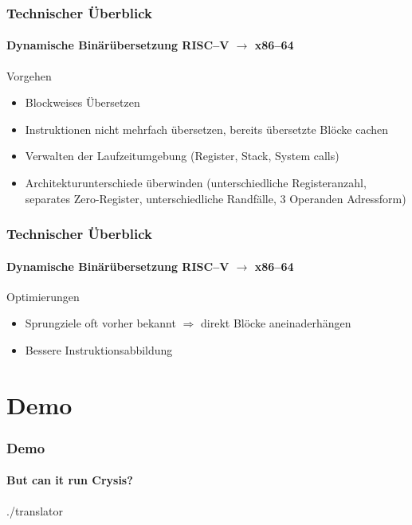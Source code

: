 \documentclass[aspectratio=169, sectionpage=false, german]{tumbeamer}
\newcommand{\conclude}[0]{\ensuremath{\Longrightarrow} }
\newcommand{\refer}[0]{\ensuremath{\rightarrow} }
\begin{document}
\begin{frame}
	\frametitle{Technischer Überblick}

	\framesubtitle {Dynamische Binärübersetzung RISC--V \refer x86--64}

	\begin{block}{Vorgehen}
		\begin{itemize}
			\item Blockweises Übersetzen
			\item Instruktionen nicht mehrfach übersetzen, bereits übersetzte Blöcke cachen %
			\item Verwalten der Laufzeitumgebung (Register, Stack, System calls)
			\item Architekturunterschiede überwinden (unterschiedliche Registeranzahl, separates Zero-Register, unterschiedliche Randfälle, 3 Operanden Adressform)
		\end{itemize}
	\end{block}
\end{frame}

\begin{frame}
	\frametitle{Technischer Überblick}

	\framesubtitle {Dynamische Binärübersetzung RISC--V \refer x86--64}

	\begin{block}{Optimierungen}
		\begin{itemize}
			\item Sprungziele oft vorher bekannt \conclude direkt Blöcke aneinaderhängen
			\item Bessere Instruktionsabbildung
		\end{itemize}
	\end{block}
\end{frame}

\section{Demo}
\begin{frame}[c]
	\frametitle{Demo}
	\framesubtitle{But can it run Crysis?}
	\centering\Huge\ttfamily
	./translator
\end{frame}
\end{document}
